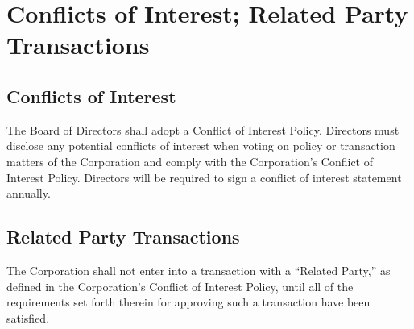 \section{Conflicts of Interest; Related Party Transactions}

\subsection{Conflicts of Interest}
The Board of Directors shall adopt a Conflict of Interest
Policy. Directors must disclose any potential conflicts of interest
when voting on policy or transaction matters of the Corporation and
comply with the Corporation’s Conflict of Interest Policy. Directors
will be required to sign a conflict of interest statement annually.

\subsection{Related Party Transactions}
The Corporation shall not enter into a transaction with a ``Related
Party,'' as defined in the Corporation’s Conflict of Interest Policy,
until all of the requirements set forth therein for approving such a
transaction have been satisfied.

